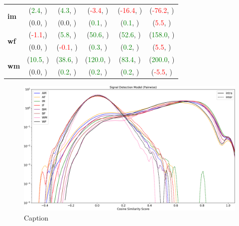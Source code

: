 \begin{table}
\begin{center}
\begin{tabular}{l c c c c c}
    \multirow{2}{3mm}{\textbf{\gls{im}}} &(\textcolor{green}{2.4}, )&(\textcolor{green}{4.3}, )&(\textcolor{red}{-3.4}, )&(\textcolor{red}{-16.4}, )&(\textcolor{red}{-76.2}, )\\[-4pt]
        & (0.0, ) &(0.0, )  & (\textcolor{green}{0.1}, ) & (\textcolor{green}{0.1}, )  &(\textcolor{red}{5.5}, ) \\[-1pt]
        
    \multirow{2}{3mm}{\textbf{\gls{wf}}} &(\textcolor{red}{-1.1},) &(\textcolor{green}{5.8}, ) &(\textcolor{green}{50.6}, ) &(\textcolor{green}{52.6}, ) &(\textcolor{green}{158.0}, )\\[-4pt]
       & (0.0, ) &(\textcolor{red}{-0.1}, )  & (\textcolor{green}{0.3}, ) & (\textcolor{green}{0.2}, )  &(\textcolor{red}{5.5}, )  \\[-1pt]

    \multirow{2}{3mm}{\textbf{\gls{wm}}} & (\textcolor{green}{10.5}, ) & (\textcolor{green}{38.6}, )& (\textcolor{green}{120.0}, )& (\textcolor{green}{83.4}, )& (\textcolor{green}{200.0}, ) \\[-4pt]
    
        & (0.0, ) &(\textcolor{green}{0.2}, ) &(\textcolor{green}{0.2}, ) & (\textcolor{green}{0.2}, )&(\textcolor{red}{-5.5}, )\\[-1pt]
\end{tabular}
\end{center}
\end{table}

\begin{figure}
    \centering
    \includegraphics[width=\textwidth]{figures/SDM-crop.pdf}
    \caption{Caption}
    \label{fig:my_label}
\end{figure}

